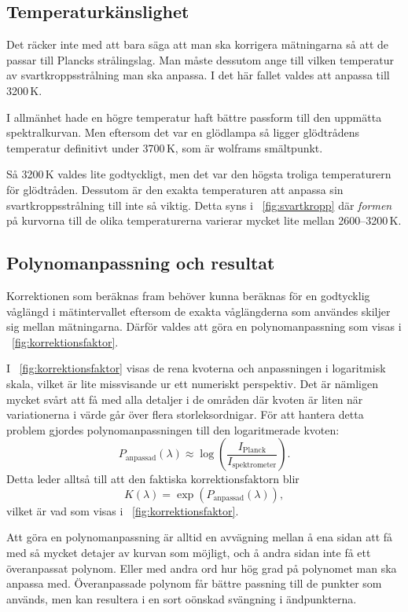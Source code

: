 \documentclass[11pt,a4paper]{article}
\newcommand{\figref}{\figurename~\ref}
\begin{document}
\subsection{Temperaturkänslighet}
Det räcker inte med att bara säga att man ska korrigera mätningarna
så att de passar till Plancks strålingslag. Man måste dessutom ange
till vilken temperatur av svartkroppsstrålning man ska anpassa. I det
här fallet valdes att anpassa till 3200\,K. 

I allmänhet hade en högre temperatur haft bättre passform till den
uppmätta spektralkurvan. Men eftersom det var en glödlampa så ligger
glödtrådens temperatur definitivt under 3700\,K, som är wolframs
smältpunkt. 

Så 3200\,K valdes lite godtyckligt, men det var den högsta troliga
temperaturern för glödtråden. Dessutom är den exakta temperaturen att
anpassa sin svartkroppsstrålning till inte så viktig. Detta syns i
\figref{fig:svartkropp} där \emph{formen} på kurvorna till de olika
temperaturerna varierar mycket lite mellan 2600--3200\,K. 


\subsection{Polynomanpassning och resultat}
Korrektionen som beräknas fram behöver kunna beräknas för en
godtycklig våglängd i mätintervallet eftersom de exakta våglängderna
som användes skiljer sig mellan mätningarna. Därför valdes att göra en
polynomanpassning som visas i \figref{fig:korrektionsfaktor}. 

I \figref{fig:korrektionsfaktor} visas de rena kvoterna och
anpassningen i logaritmisk skala, vilket är lite missvisande ur ett
numeriskt perspektiv. Det är nämligen mycket svårt att få med alla
detaljer i de områden där kvoten är liten när variationerna i värde
går över flera storleksordnigar. För att hantera detta problem gjordes
polynomanpassningen till den logaritmerade kvoten: 
\[
P_\text{anpassad} (\lambda) 
\approx \log(\frac{I_\text{Planck}}{I_\text{spektrometer}}).
\]
Detta leder alltså till att den faktiska korrektionsfaktorn blir
\[
K(\lambda) = \exp(P_\text{anpassad}(\lambda)),
\]
vilket är vad som visas i \figref{fig:korrektionsfaktor}.

Att göra en polynomanpassning är alltid en avvägning mellan å ena
sidan att få med så mycket detajer av kurvan som möjligt, och å andra
sidan inte få ett överanpassat polynom. Eller med andra ord hur hög
grad på polynomet man ska anpassa med. Överanpassade polynom får
bättre passning till de punkter som används, men kan resultera i en
sort oönskad svängning i ändpunkterna. 
\end{document}
